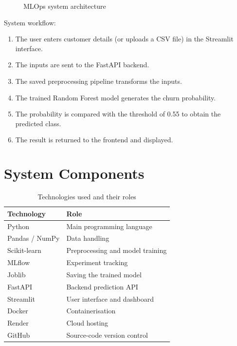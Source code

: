 \documentclass[12pt,a4paper]{report}
\begin{document}
\begin{figure}[!htbp]
{}
\caption{MLOps system architecture}
\label{fig:architecture}
\end{figure}

System workflow:

\begin{enumerate}
\item The user enters customer details (or uploads a CSV file) in the Streamlit interface.
\item The inputs are sent to the FastAPI backend.
\item The saved preprocessing pipeline transforms the inputs.
\item The trained Random Forest model generates the churn probability.
\item The probability is compared with the threshold of 0.55 to obtain the predicted class.
\item The result is returned to the frontend and displayed.
\end{enumerate}

\section{System Components}

\begin{table}[!htbp]
\centering
\caption{Technologies used and their roles}
\begin{tabular}{ll}
\toprule
\textbf{Technology} & \textbf{Role} \\
\midrule
Python & Main programming language \\
Pandas / NumPy & Data handling \\
Scikit-learn & Preprocessing and model training \\
MLflow & Experiment tracking \\
Joblib & Saving the trained model \\
FastAPI & Backend prediction API \\
Streamlit & User interface and dashboard \\
Docker & Containerisation \\
Render & Cloud hosting \\
GitHub & Source-code version control \\
\bottomrule
\end{tabular}
\end{table}
\end{document}
